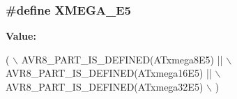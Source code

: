 \subsubsection[{X\+M\+E\+G\+A\+\_\+\+E5}]{\setlength{\rightskip}{0pt plus 5cm}\#define X\+M\+E\+G\+A\+\_\+\+E5}\label{group__xmega__part__macros__group_ga3bbcf2e955c9747a3595f8cdc01436ba}
{\bfseries Value\+:}
\begin{DoxyCode}
( \(\backslash\)
        AVR8\_PART\_IS\_DEFINED(ATxmega8E5)   || \(\backslash\)
        AVR8\_PART\_IS\_DEFINED(ATxmega16E5)  || \(\backslash\)
        AVR8\_PART\_IS\_DEFINED(ATxmega32E5)     \(\backslash\)
    )
\end{DoxyCode}
